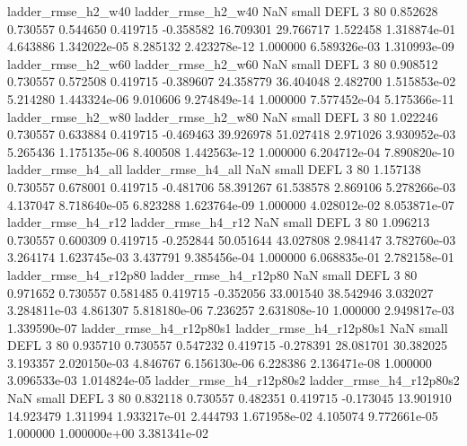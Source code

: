       ladder_rmse_h2_w40       ladder_rmse_h2_w40                   NaN      small     DEFL                 3 80 0.852628       0.730557 0.544650       0.419715   -0.358582     16.709301     29.766717     1.522458   1.318874e-01  4.643886 1.342022e-05     8.285132   2.423278e-12            1.000000    6.589326e-03        1.310993e-09
      ladder_rmse_h2_w60       ladder_rmse_h2_w60                   NaN      small     DEFL                 3 80 0.908512       0.730557 0.572508       0.419715   -0.389607     24.358779     36.404048     2.482700   1.515853e-02  5.214280 1.443324e-06     9.010606   9.274849e-14            1.000000    7.577452e-04        5.175366e-11
      ladder_rmse_h2_w80       ladder_rmse_h2_w80                   NaN      small     DEFL                 3 80 1.022246       0.730557 0.633884       0.419715   -0.469463     39.926978     51.027418     2.971026   3.930952e-03  5.265436 1.175135e-06     8.400508   1.442563e-12            1.000000    6.204712e-04        7.890820e-10
      ladder_rmse_h4_all       ladder_rmse_h4_all                   NaN      small     DEFL                 3 80 1.157138       0.730557 0.678001       0.419715   -0.481706     58.391267     61.538578     2.869106   5.278266e-03  4.137047 8.718640e-05     6.823288   1.623764e-09            1.000000    4.028012e-02        8.053871e-07
      ladder_rmse_h4_r12       ladder_rmse_h4_r12                   NaN      small     DEFL                 3 80 1.096213       0.730557 0.600309       0.419715   -0.252844     50.051644     43.027808     2.984147   3.782760e-03  3.264174 1.623745e-03     3.437791   9.385456e-04            1.000000    6.068835e-01        2.782158e-01
   ladder_rmse_h4_r12p80    ladder_rmse_h4_r12p80                   NaN      small     DEFL                 3 80 0.971652       0.730557 0.581485       0.419715   -0.352056     33.001540     38.542946     3.032027   3.284811e-03  4.861307 5.818180e-06     7.236257   2.631808e-10            1.000000    2.949817e-03        1.339590e-07
 ladder_rmse_h4_r12p80s1  ladder_rmse_h4_r12p80s1                   NaN      small     DEFL                 3 80 0.935710       0.730557 0.547232       0.419715   -0.278391     28.081701     30.382025     3.193357   2.020150e-03  4.846767 6.156130e-06     6.228386   2.136471e-08            1.000000    3.096533e-03        1.014824e-05
 ladder_rmse_h4_r12p80s2  ladder_rmse_h4_r12p80s2                   NaN      small     DEFL                 3 80 0.832118       0.730557 0.482351       0.419715   -0.173045     13.901910     14.923479     1.311994   1.933217e-01  2.444793 1.671958e-02     4.105074   9.772661e-05            1.000000    1.000000e+00        3.381341e-02
